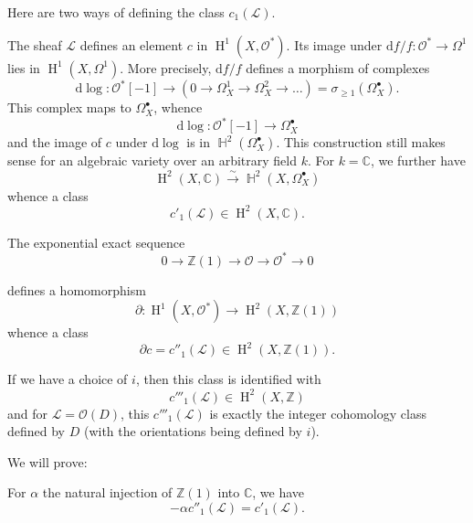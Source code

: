     Here are two ways of defining the class \(c_1(\mathcal {L})\).\label{hodge-theory-ii-2.2.4.1}\par{}The sheaf \(\mathcal {L}\) defines an element \(c\) in \(\operatorname {H}^1(X,\mathcal {O}^*)\).
      Its image under \(\mathrm {d} f/f\colon \mathcal {O}^*\to \Omega ^1\) lies in \(\operatorname {H}^1(X,\Omega ^1)\).
      More precisely, \(\mathrm {d} f/f\) defines a morphism of complexes
      \[         \mathrm {d}\log \colon          \mathcal {O}^*[-1]         \to  (0\to \Omega _X^1\to \Omega _X^2\to \ldots )         = \sigma _{\geqslant 1}(\Omega _X^\bullet ).       \]
      This complex maps to \(\Omega _X^\bullet \), whence
      \[         \mathrm {d}\log \colon  \mathcal {O}^*[-1]\to \Omega _X^\bullet        \]
      and the image of \(c\) under \(\mathrm {d}\log \) is in \(\operatorname {\mathbb {H}}^2(\Omega _X^\bullet )\).
      This construction still makes sense for an algebraic variety over an arbitrary field \(k\).
      For \(k=\mathbb {C}\), we further have
      \[         \operatorname {H}^2(X,\mathbb {C})         \xrightarrow {\sim } \operatorname {\mathbb {H}}^2(X,\Omega _X^\bullet )       \]
      whence a class
      \[         c'_1(\mathcal {L}) \in  \operatorname {H}^2(X,\mathbb {C}).       \]\label{hodge-theory-ii-2.2.4.2}\par{}The exponential exact sequence
      \[         0         \to  \mathbb {Z}(1)         \to  \mathcal {O}         \to  \mathcal {O}^*         \to  0       \]
      
      defines a homomorphism
      \[         \partial \colon  \operatorname {H}^1(X,\mathcal {O}^*)\to \operatorname {H}^2(X,\mathbb {Z}(1))       \]
      whence a class
      \[         \partial  c         = c''_1(\mathcal {L}) \in  \operatorname {H}^2(X,\mathbb {Z}(1)).       \]\par{}If we have a choice of \(i\), then this class is identified with
      \[         c'''_1(\mathcal {L}) \in  \operatorname {H}^2(X,\mathbb {Z})       \]
      and for \(\mathcal {L}=\mathcal {O}(D)\), this \(c'''_1(\mathcal {L})\) is exactly the integer cohomology class defined by \(D\) (with the orientations being defined by \(i\)).\label{hodge-theory-ii-2.2.5}\par{}We will prove:

    \label{hodge-theory-ii-2.2.5.1}\par{}For \(\alpha \) the natural injection of \(\mathbb {Z}(1)\) into \(\mathbb {C}\), we have
        \[           -\alpha  c''_1(\mathcal {L})           = c'_1(\mathcal {L}).         \]

